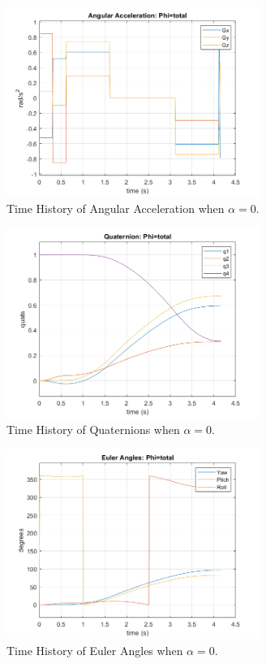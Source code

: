 \documentclass[letterpaper, preprint, paper,11pt]{AAS}	%
\begin{document}
			
			\begin{figure}[H]
				\label{fig:ang_accel_total_alpha0}
				\begin{center}
					\includegraphics[width=3.25in]{figures/alpha0/ang_accel.png}
				\end{center}
				\caption{Time History of Angular Acceleration when $\alpha=0$.}
			\end{figure}
			
			\begin{figure}[H]
				\label{fig:quats_phi_total_alpha0}
				\begin{center}
					\includegraphics[width=3.25in]{figures/alpha0/quats.png}
				\end{center}
				\caption{Time History of Quaternions when $\alpha=0$.}
			\end{figure}
			
			\begin{figure}[H]
				\label{fig:euler_ang_phi_total_alpha0}
				\begin{center}
					\includegraphics[width=3.25in]{figures/alpha0/euler_angles.png}
				\end{center}
				\caption{Time History of Euler Angles when $\alpha=0$.}
			\end{figure}
			
\end{document}
